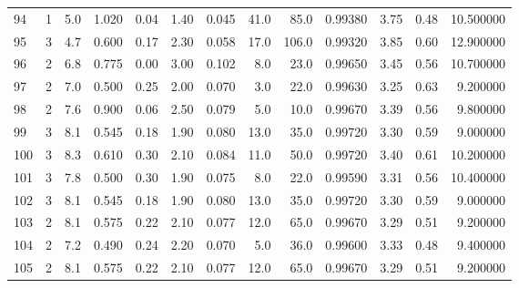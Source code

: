 \begin{tabular}{lrrrrrrrrrrrr}
94   &        1 &            5.0 &             1.020 &         0.04 &            1.40 &      0.045 &                 41.0 &                  85.0 &  0.99380 &  3.75 &       0.48 &  10.500000 \\
95   &        3 &            4.7 &             0.600 &         0.17 &            2.30 &      0.058 &                 17.0 &                 106.0 &  0.99320 &  3.85 &       0.60 &  12.900000 \\
96   &        2 &            6.8 &             0.775 &         0.00 &            3.00 &      0.102 &                  8.0 &                  23.0 &  0.99650 &  3.45 &       0.56 &  10.700000 \\
97   &        2 &            7.0 &             0.500 &         0.25 &            2.00 &      0.070 &                  3.0 &                  22.0 &  0.99630 &  3.25 &       0.63 &   9.200000 \\
98   &        2 &            7.6 &             0.900 &         0.06 &            2.50 &      0.079 &                  5.0 &                  10.0 &  0.99670 &  3.39 &       0.56 &   9.800000 \\
99   &        3 &            8.1 &             0.545 &         0.18 &            1.90 &      0.080 &                 13.0 &                  35.0 &  0.99720 &  3.30 &       0.59 &   9.000000 \\
100  &        3 &            8.3 &             0.610 &         0.30 &            2.10 &      0.084 &                 11.0 &                  50.0 &  0.99720 &  3.40 &       0.61 &  10.200000 \\
101  &        3 &            7.8 &             0.500 &         0.30 &            1.90 &      0.075 &                  8.0 &                  22.0 &  0.99590 &  3.31 &       0.56 &  10.400000 \\
102  &        3 &            8.1 &             0.545 &         0.18 &            1.90 &      0.080 &                 13.0 &                  35.0 &  0.99720 &  3.30 &       0.59 &   9.000000 \\
103  &        2 &            8.1 &             0.575 &         0.22 &            2.10 &      0.077 &                 12.0 &                  65.0 &  0.99670 &  3.29 &       0.51 &   9.200000 \\
104  &        2 &            7.2 &             0.490 &         0.24 &            2.20 &      0.070 &                  5.0 &                  36.0 &  0.99600 &  3.33 &       0.48 &   9.400000 \\
105  &        2 &            8.1 &             0.575 &         0.22 &            2.10 &      0.077 &                 12.0 &                  65.0 &  0.99670 &  3.29 &       0.51 &   9.200000 \\

\end{tabular}
